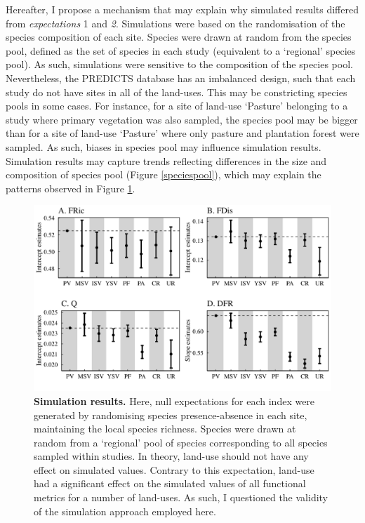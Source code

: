 Hereafter, I propose a mechanism that may explain why simulated results differed from \textit{expectations }1 and \textit{2}. Simulations were based on the randomisation of the species composition of each site. Species were drawn at random from the species pool, defined as the set of species in each study (equivalent to a `regional' species pool). As such, simulations were sensitive to the composition of the species pool. Nevertheless, the PREDICTS database has an imbalanced design, such that each study do not have sites in all of the land-uses. This may be constricting species pools in some cases. For instance, for a site of land-use `Pasture' belonging to a study where primary vegetation was also sampled, the species pool may be bigger than for a site of land-use `Pasture' where only pasture and plantation forest were sampled. As such, biases in species pool may influence simulation results. Simulation results may capture trends reflecting differences in the size and composition of species pool (Figure \ref{speciespool}), which may explain the patterns observed in Figure \ref{simresults}. 

\begin{figure}[h!]
\centering
\includegraphics[scale=0.70]{figures/chapter3/Simulations/p_sim}
\caption[Simulation results.]{\textbf{Simulation results.} Here, null expectations for each index were generated by randomising species presence-absence in each site, maintaining the local species richness. Species were drawn at random from a `regional' pool of species corresponding to all species sampled within studies. In theory, land-use should not have any effect on simulated values. Contrary to this expectation, land-use had a significant effect on the simulated values of all functional metrics for a number of land-uses. As such, I questioned the validity of the simulation approach employed here.}
\label{simresults}
\end{figure}

